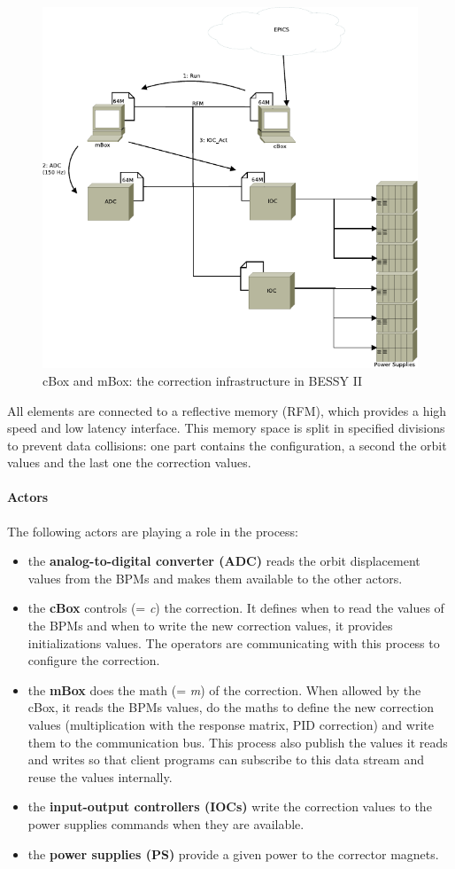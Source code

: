 \begin{figure}[!h]
    \centering
    \includegraphics[width=.85\linewidth]{img/mBox_cBox}
    \caption{\label{fig:cbox_mbox}cBox and mBox: the correction infrastructure in BESSY II}
\end{figure}

All elements are connected to a reflective memory (RFM), which provides a high speed and low latency interface. This memory space is split in specified divisions to prevent data collisions: one part contains the configuration, a second the orbit values and the last one the correction values.

\paragraph{Actors}
The following actors are playing a role in the process:
\begin{itemize}
    \item the \textbf{analog-to-digital converter (ADC)} reads the orbit displacement values from the BPMs and makes them available to the other actors.
    \item the \textbf{cBox} controls (= \textit{c}) the correction. It defines when to read the values of the BPMs and when to write the new correction values, it provides initializations values. The operators are communicating with this process to configure the correction.
    \item the \textbf{mBox} does the math (= \textit{m}) of the correction. When allowed by the cBox, it reads the BPMs values, do the maths to define the new correction values (multiplication with the response matrix, PID correction) and write them to the communication bus. This process also publish the values it reads and writes so that client programs can subscribe to this data stream and reuse the values internally.
    \item the \textbf{input-output controllers (IOCs)} write the correction values to the power supplies commands when they are available.
    \item the \textbf{power supplies (PS)} provide a given power to the corrector magnets.
\end{itemize}

